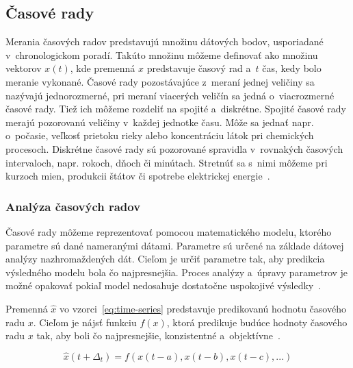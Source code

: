 \documentclass[a4paper,twoside,slovak,12pt,appendix]{article}
\begin{document}

\subsection{Časové rady}
Merania časových radov predstavujú množinu dátových bodov, usporiadané
v~chronologickom poradí. Takúto množinu môžeme definovať ako množinu vektorov
$x(t)$, kde premenná $x$ predstavuje časový rad a~$t$ čas, kedy bolo meranie
vykonané. Časové rady pozostávajúce z~meraní jednej veličiny sa nazývajú
jednorozmerné, pri meraní viacerých veličín sa jedná o~viacrozmerné časové rady.
Tiež ich môžeme rozdeliť na spojité a~diskrétne. Spojité časové rady merajú
pozorovanú veličiny v~každej jednotke času. Môže sa jednať napr. o~počasie,
veľkosť prietoku rieky alebo koncentráciu látok pri chemických procesoch.
Diskrétne časové rady sú pozorované spravidla v~rovnakých časových intervaloch,
napr. rokoch, dňoch či minútach. Stretnúť sa s~nimi môžeme pri kurzoch mien,
produkcii štátov či spotrebe elektrickej energie~\cite{Agrawal2013}.


\subsubsection{Analýza časových radov}
Časové rady môžeme reprezentovať pomocou matematického modelu, ktorého parametre
sú dané nameranými dátami. Parametre sú určené na základe dátovej analýzy
nazhromaždených dát. Cieľom je určiť parametre tak, aby predikcia výsledného
modelu bola čo najpresnejšia. Proces analýzy a~úpravy parametrov je možné
opakovať pokiaľ model nedosahuje dostatočne uspokojivé
výsledky~\cite{Agrawal2013}.

Premenná $\hat{x}$ vo vzorci~\ref{eq:time-series} predstavuje predikovanú
hodnotu časového radu $x$. Cieľom je nájsť funkciu $f(x)$, ktorá predikuje
budúce hodnoty časového radu $x$ tak, aby boli čo najpresnejšie, konzistentné
a~objektívne~\cite{Sapankevych2009}.

\begin{equation}
  \hat{x}(t+\Delta_t) = f(x(t-a), x(t-b), x(t-c), ...)
  \label{eq:time-series}
\end{equation}
\end{document}
